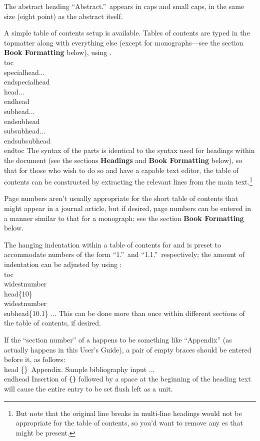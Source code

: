 The abstract heading ``{\eightpoint\smc Abstract.}''\ appears in caps
and small caps, in the same size (eight point) as the abstract itself.

A simple table of contents setup is available.  Tables of contents
are typed in the topmatter along with everything else (except for
monographs---see the section {\bf Book Formatting} below), using
.
\beginexample{}
\\toc
\\specialhead...\\endspecialhead
\\head...\\endhead
\\subhead...\\endsubhead
\\subsubhead...\\endsubsubhead
\\endtoc
\endexample
\noindent
The syntax of the parts is identical to the syntax used
for headings within the document (see the sections {\bf Headings} and
{\bf Book Formatting} below), so that for those who wish to do so
and have a capable text editor, the table of contents can be constructed
by extracting the relevant lines from the main text.\footnote{But note that
the original line breaks in multi-line headings would not be appropriate
for the table of contents, so you'd want to remove any \cs{\\}es that
might be present.}

Page numbers aren't usually appropriate for the short table of contents
that might appear in a journal article, but if desired, page numbers can
be entered in a manner similar to that for a monograph; see the section
{\bf Book Formatting} below.

The hanging indentation within a table of contents for  and
 is preset to accommodate numbers of the form
``1.''\ and ``1.1.''\ respectively; the amount of indentation can
be adjusted by using :
\beginexample{}
\\toc
\\widestnumber\\head\{10\}
\\widestnumber\\subhead\{10.1\}
...
\endexample
\noindent This can be done more than once within different sections of
the table of contents, if desired.

If the ``section number'' of a  happens to be something like
``Appendix'' (as actually happens in this User's Guide), a pair
of empty braces should be entered before it, as follows:
\beginexample{}
\\head \{\}\ Appendix. Sample bibliography input ...\\endhead
\endexample
\noindent
Insertion of {\tt\{\}} followed by a space at the beginning of the heading
text will cause the entire entry to be set flush left as a unit.

